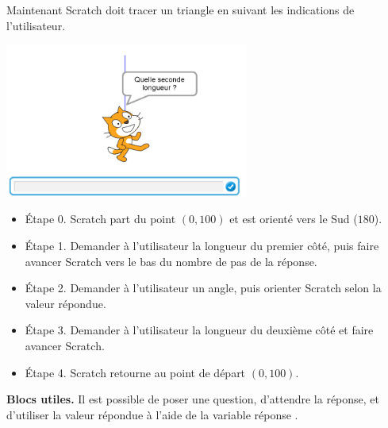 \documentclass[class=report,crop=false, 12pt]{standalone}
\begin{document}
\begin{activite}

Maintenant Scratch doit tracer un triangle en suivant les indications de l'utilisateur.

\begin{center}
  \includegraphics[width=0.6\textwidth]{ecran-05-ex2} 
\end{center}




\begin{itemize}
  \item \'Etape 0. Scratch part du point $(0,100)$ et est orienté vers le Sud ($180$\textdegree).
  
  \item \'Etape 1. Demander à l'utilisateur la longueur du premier côté, puis faire avancer Scratch vers le bas du nombre de pas de la réponse.
  
  \item \'Etape 2. Demander à l'utilisateur un angle, puis orienter Scratch selon la valeur répondue.
   
  \item \'Etape 3. Demander à l'utilisateur la longueur du deuxième côté et faire avancer Scratch.
  
  \item \'Etape 4. Scratch retourne au point de départ $(0,100)$.
\end{itemize}

\bigskip

\textbf{Blocs utiles.}
Il est possible de poser une question, d'attendre la réponse, et d'utiliser la valeur répondue à l'aide de la variable \og réponse \fg{}.

\begin{center}
\begin{scratch}
\end{scratch}
  \qquad\qquad\qquad
{}
\end{center}

\end{activite}
\end{document}
